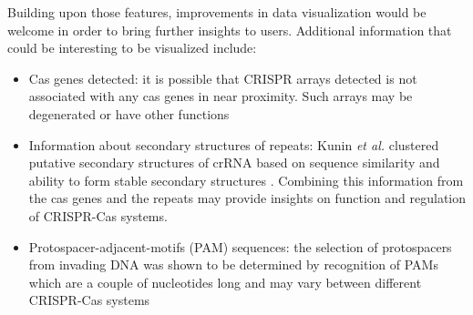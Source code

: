 \documentclass[11pt, a4paper,titlepage]{article}
\begin{document}
Building upon those features, improvements in data visualization would
be welcome in order to bring further insights to users. Additional
information that could be interesting to be visualized include:
\begin{itemize}
\item Cas genes detected: it is possible that CRISPR arrays detected
  is not associated with any cas genes in near proximity. Such arrays
  may be degenerated or have other functions
  \cite{mandin2007identification}
\item Information about secondary structures of repeats: Kunin \emph{et
  al.} clustered putative secondary structures of crRNA based on
  sequence similarity and ability to form stable secondary structures
  \cite{kunin2007evolutionary}. Combining this information from the
  cas genes and the repeats may provide insights on function and
  regulation of CRISPR-Cas systems.
\item Protospacer-adjacent-motifs (PAM) sequences: the selection of
  protospacers from invading DNA was shown to be determined by
  recognition of PAMs which are a couple of nucleotides long and
  may vary between different CRISPR-Cas systems
  \cite{mojica2009short,deveau2008phage}
\end{itemize}


\newpage
 

\end{document}
